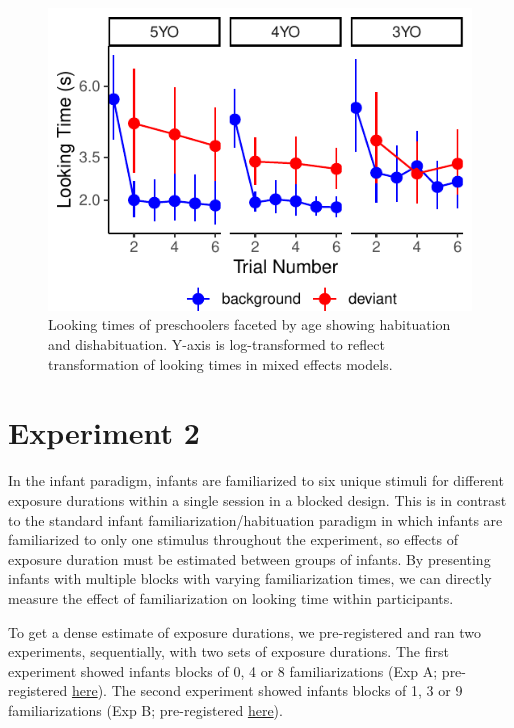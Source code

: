 \documentclass[10pt, letterpaper]{article}
\newenvironment{CodeChunk}{}{}
\begin{document}
\captionsetup{belowskip=2pt,aboveskip=4pt}

\begin{CodeChunk}
\begin{figure}[t!]

\includegraphics{figs/unnamed-chunk-13-1} \hfill{}

\caption[Looking times of preschoolers faceted by age showing habituation and dishabituation]{Looking times of preschoolers faceted by age showing habituation and dishabituation. Y-axis is log-transformed to reflect transformation of looking times in mixed effects models.}\label{fig:unnamed-chunk-13}
\end{figure}
\end{CodeChunk}

\hypertarget{experiment-2}{%
\section{Experiment 2}\label{experiment-2}}

In the infant paradigm, infants are familiarized to six unique stimuli
for different exposure durations within a single session in a blocked
design. This is in contrast to the standard infant
familiarization/habituation paradigm in which infants are familiarized
to only one stimulus throughout the experiment, so effects of exposure
duration must be estimated between groups of infants. By presenting
infants with multiple blocks with varying familiarization times, we can
directly measure the effect of familiarization on looking time within
participants.

To get a dense estimate of exposure durations, we pre-registered and ran
two experiments, sequentially, with two sets of exposure durations. The
first experiment showed infants blocks of 0, 4 or 8 familiarizations
(Exp A; pre-registered
\href{https://osf.io/gux4f/?view_only=b4d6d0118dfa41a79fb431d389f4fecc}{here}).
The second experiment showed infants blocks of 1, 3 or 9
familiarizations (Exp B; pre-registered
\href{https://osf.io/w6pgu/?view_only=39ee108159884761a0c5bc68d11918df}{here}).
\end{document}
